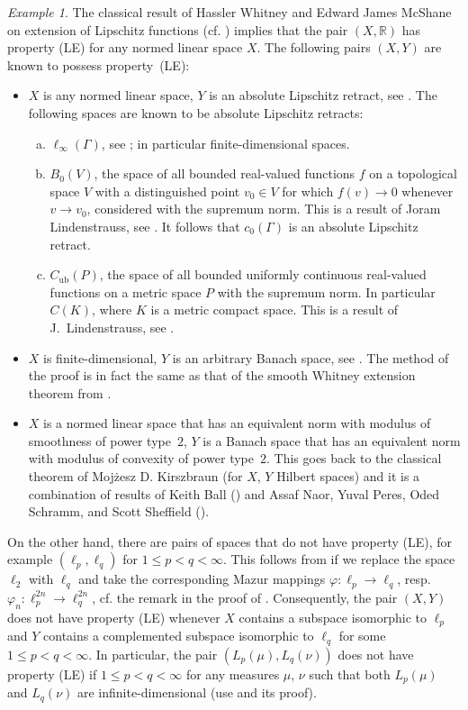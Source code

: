 \documentclass[a4paper,twoside,10pt,reqno,draft]{amsart}
\theoremstyle{definition}
\theoremstyle{remark}
\newtheorem{example}[theorem]{Example}
\newcommand\Ga{\Gamma}
\newcommand\vp{\varphi}
\newcommand\R{{\mathbb R}}
\newcommand\Cub{C_{\mathrm{ub}}}
\newcommand\pLE{(LE)}
\begin{document}
\begin{example}\label{ex:pairs_LE}
The classical result of Hassler Whitney \cite[p.~63]{Wh1} and Edward James McShane \cite{MS} on extension of Lipschitz functions (cf. \cite[Lemma~7.39]{HJ}) implies that the pair $(X,\R)$ has property {\pLE} for any normed linear space $X$.
The following pairs $(X,Y)$ are known to possess property~\pLE:
\begin{itemize}
\item $X$ is any normed linear space, $Y$ is an absolute Lipschitz retract, see \cite[Proposition~1.2 and the Remark (iii) after]{BL}.
The following spaces are known to be absolute Lipschitz retracts:
\begin{enumerate}[(a)]
\item $\ell_\infty(\Ga)$, see \cite[Fact~7.76]{HJ}; in particular finite-dimensional spaces.
\item $B_0(V)$, the space of all bounded real-valued functions $f$ on a topological space $V$ with a distinguished point $v_0\in V$ for which $f(v)\to0$ whenever $v\to v_0$, considered with the supremum norm.
This is a result of Joram Lindenstrauss, see \cite[Theorem~6]{L}.
It follows that $c_0(\Ga)$ is an absolute Lipschitz retract.
\item $\Cub(P)$, the space of all bounded uniformly continuous real-valued functions on a metric space $P$ with the supremum norm.
In particular $C(K)$, where $K$ is a metric compact space.
This is a result of J.~Lindenstrauss, see \cite[Theorem~1.6]{BL}.
\end{enumerate}
\item $X$ is finite-dimensional, $Y$ is an arbitrary Banach space, see \cite[Theorem~2]{JLS}.
The method of the proof is in fact the same as that of the smooth Whitney extension theorem from \cite{Wh1}.
\item $X$ is a normed linear space that has an equivalent norm with modulus of smoothness of power type~$2$, $Y$ is a Banach space that has an equivalent norm with modulus of convexity of power type~$2$.
This goes back to the classical theorem of Mojżesz D. Kirszbraun (for $X$, $Y$ Hilbert spaces)
and it is a combination of results of Keith Ball (\cite[Theorem~1.7, Theorem~4.1]{B}) and Assaf Naor, Yuval Peres, Oded Schramm, and Scott Sheffield (\cite[Theorem~1.2]{NPSS}).
\end{itemize}

On the other hand, there are pairs of spaces that do not have property \pLE, for example $(\ell_p,\ell_q)$ for $1\le p<q<\infty$.
This follows from \cite[the proof on p.~266--268]{Naor} if we replace the space $\ell_2$ with $\ell_q$ and take the corresponding Mazur mappings $\vp\colon\ell_p\to\ell_q$, resp. $\vp_n\colon\ell_p^{2n}\to\ell_q^{2n}$,
cf. the remark in the proof of \cite[Proposition~5]{Naor}.
Consequently, the pair $(X,Y)$ does not have property {\pLE} whenever $X$ contains a subspace isomorphic to $\ell_p$ and $Y$ contains a complemented subspace isomorphic to $\ell_q$ for some $1\le p<q<\infty$.
In particular, the pair $(L_p(\mu),L_q(\nu))$ does not have property {\pLE} if $1\le p<q<\infty$ for any measures $\mu$, $\nu$ such that both $L_p(\mu)$ and $L_q(\nu)$ are infinite-dimensional
(use \cite[Proposition~6.4.1]{AlKa} and its proof).


\end{example}
\end{document}
